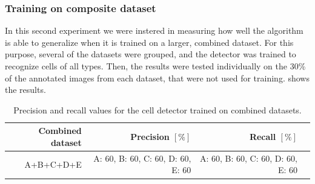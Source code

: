 
		
		\subsubsection{Training on composite dataset}
		
		In this second experiment we were instered in measuring how well the algorithm is able to generalize when it is trained on a larger, combined dataset. For this purpose, several of the datasets were grouped, and the detector was trained to recognize cells of all types. Then, the results were tested individually on the 30\% of the annotated images from each dataset, that were not used for training.  shows the results.
		
		
		
		
		\begin{table}[h]
			\centering
			\begin{tabular}{rrrr}
				Combined dataset &                  Precision $\left[ \% \right]$ &                     Recall $\left[ \% \right]$ &  \\
			\hline
				       A+B+C+D+E & A: 60, B: 60, C: 60, D: 60, E: 60 & A: 60, B: 60, C: 60, D: 60, E: 60 &
			\end{tabular} 
			\caption{Precision and recall values for the cell detector trained on combined datasets.}
			\label{tab:results_detector_combined}
		\end{table}
				
		
